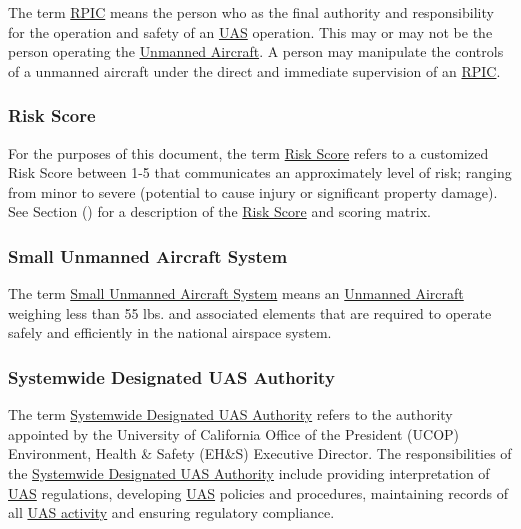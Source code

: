 \documentclass[
]{book}
\begin{document}
The term \protect\hyperlink{RPIC}{RPIC} means the person who as the final authority and responsibility for the operation and safety of an \protect\hyperlink{UAS}{UAS} operation. This may or may not be the person operating the \protect\hyperlink{UA}{Unmanned Aircraft}. A person may manipulate the controls of a unmanned aircraft under the direct and immediate supervision of an \protect\hyperlink{RPIC}{RPIC}.







\hypertarget{riskscore}{%
\subsubsection*{Risk Score}\label{riskscore}}

For the purposes of this document, the term \protect\hyperlink{riskscore}{Risk Score} refers to a customized Risk Score between 1-5 that communicates an approximately level of risk; ranging from minor to severe (potential to cause injury or significant property damage). See Section () for a description of the \protect\hyperlink{riskscore}{Risk Score} and scoring matrix.



\hypertarget{sUAS}{%
\subsubsection*{Small Unmanned Aircraft System}\label{sUAS}}

The term \protect\hyperlink{sUAS}{Small Unmanned Aircraft System} means an \protect\hyperlink{UA}{Unmanned Aircraft} weighing less than 55 lbs. and associated elements that are required to operate safely and efficiently in the national airspace system.





\hypertarget{SDA}{%
\subsubsection*{Systemwide Designated UAS Authority}\label{SDA}}

The term \protect\hyperlink{SDA}{Systemwide Designated UAS Authority} refers to the authority appointed by the University of California Office of the President (UCOP) Environment, Health \& Safety (EH\&S) Executive Director. The responsibilities of the \protect\hyperlink{SDA}{Systemwide Designated UAS Authority} include providing interpretation of \protect\hyperlink{UAS}{UAS} regulations, developing \protect\hyperlink{UAS}{UAS} policies and procedures, maintaining records of all \protect\hyperlink{UASactivity}{UAS activity} and ensuring regulatory compliance.
\end{document}
